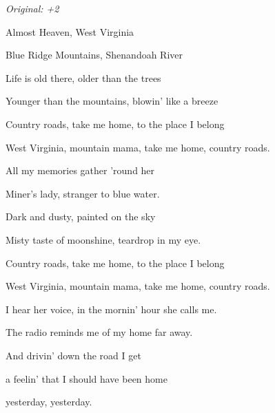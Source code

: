 \begin{song}


 \quad
\textit{Original: +2}

\large


\Large

\bigskip

 Almost Heaven,  West Virginia \par
{} Blue Ridge Mountains, Shenandoah River \par
{} Life is old there, older than the trees \par
{}Younger than the mountains, blowin' like a breeze \par

\bigskip

Country roads, take me home, to the place I belong \par
West Virginia, mountain mama, take me home, country roads. \par

\bigskip

 All my memories  gather 'round her \par
{} Miner's lady, stranger to blue water. \par
{} Dark and dusty, painted on the sky \par
{}Misty taste of moonshine, teardrop in my eye. \par

\bigskip

Country roads, take me home, to the place I belong \par
West Virginia, mountain mama, take me home, country roads. \par

\bigskip

 I hear her voice, in the mornin' hour she calls me. \par
The radio reminds me of my home far away. \par
And drivin' down the road I get \par
a feelin' that I should have been home \par
{}yesterday, yesterday. \par


\end{song}
